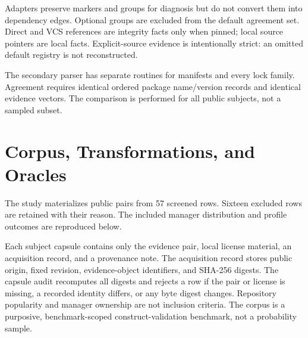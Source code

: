 \documentclass[10pt,conference]{IEEEtran}
\begin{document}
Adapters preserve markers and groups for diagnosis but do not convert them into dependency edges. Optional groups are excluded from the default agreement set. Direct and VCS references are integrity facts only when pinned; local source pointers are local facts. Explicit-source evidence is intentionally strict: an omitted default registry is not reconstructed.

The secondary parser has separate routines for manifests and every lock family. Agreement requires identical ordered package name/version records and identical evidence vectors. The comparison is performed for all \SubjectCount{} public subjects, not a sampled subset.

\section{Corpus, Transformations, and Oracles}
The study materializes \SubjectCount{} public pairs from 57 screened rows. Sixteen excluded rows are retained with their reason. The included manager distribution and profile outcomes are reproduced below.

\begin{table}[t]
\caption{Included pairs and outcomes.}
\centering\small

\end{table}

Each subject capsule contains only the evidence pair, local license material, an acquisition record, and a provenance note. The acquisition record stores public origin, fixed revision, evidence-object identifiers, and SHA-256 digests. The capsule audit recomputes all digests and rejects a row if the pair or license is missing, a recorded identity differs, or any byte digest changes. Repository popularity and manager ownership are not inclusion criteria. The corpus is a purposive, benchmark-scoped construct-validation benchmark, not a probability sample.
\end{document}

